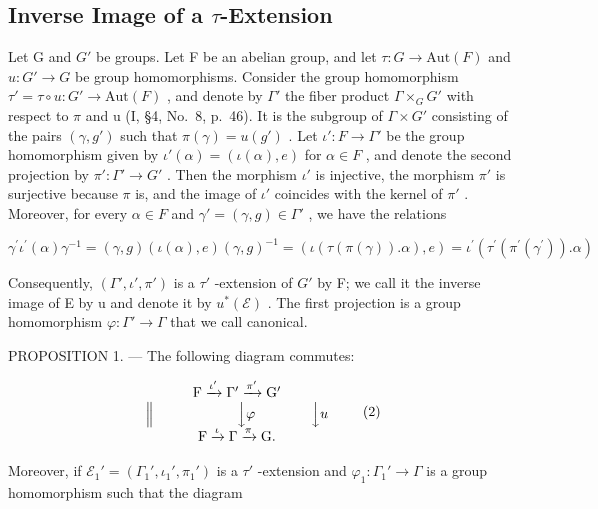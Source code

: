 \subsection{\texorpdfstring{Inverse Image of a \(\tau\)-Extension}{Inverse Image of a \textbackslash tau-Extension}}

Let G and \(G'\) be groups. Let F be an abelian group, and let \(\tau: G \to \text{Aut}(F)\) and \(u: G' \to G\) be group homomorphisms. Consider the group homomorphism \(\tau' = \tau \circ u: G' \to \text{Aut}(F)\) , and denote by \(\Gamma'\) the fiber product \(\Gamma \times_{G} G'\) with respect to \(\pi\) and u (I, §4, No.~8, p.~46). It is the subgroup of \(\Gamma \times G'\) consisting of the pairs \((\gamma, g')\) such that \(\pi(\gamma) = u(g')\) . Let \(\iota': F \to \Gamma'\) be the group homomorphism given by \(\iota'(\alpha) = (\iota(\alpha), e)\) for \(\alpha \in F\) , and denote the second projection by \(\pi': \Gamma' \to G'\) . Then the morphism \(\iota'\) is injective, the morphism \(\pi'\) is surjective because \(\pi\) is, and the image of \(\iota'\) coincides with the kernel of \(\pi'\) . Moreover, for every \(\alpha \in F\) and \(\gamma' = (\gamma, g) \in \Gamma'\) , we have the relations

\[
\gamma^ {\prime} \iota^ {\prime} (\alpha) \gamma^ {- 1} = (\gamma , g) (\iota (\alpha), e) (\gamma , g) ^ {- 1} = (\iota (\tau (\pi (\gamma)). \alpha), e) = \iota^ {\prime} (\tau^ {\prime} (\pi^ {\prime} (\gamma^ {\prime})). \alpha)
\]

Consequently, \((\Gamma', \iota', \pi')\) is a \(\tau'\) -extension of \(G'\) by F; we call it the inverse image of E by u and denote it by \(u^{*}(\mathcal{E})\) . The first projection is a group homomorphism \(\varphi : \Gamma' \to \Gamma\) that we call canonical.

PROPOSITION 1. --- The following diagram commutes:

\[
\begin{array}{c} \mathrm{F} \xrightarrow {\iota^ {\prime}} \Gamma^ {\prime} \xrightarrow {\pi^ {\prime}} \mathrm{G} ^ {\prime} \\ \Big \| \qquad \qquad \qquad \Big \downarrow \varphi \qquad \qquad \Big \downarrow u \\ \mathrm{F} \xrightarrow {\iota} \Gamma \xrightarrow {\pi} \mathrm{G}. \end{array}\tag{2}
\]

Moreover, if \(\mathcal{E}_1' = (\Gamma_1', \iota_1', \pi_1')\) is a \(\tau'\) -extension and \(\varphi_1: \Gamma_1' \to \Gamma\) is a group homomorphism such that the diagram

